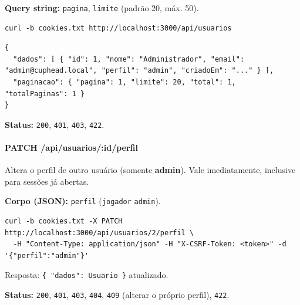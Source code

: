 \textbf{Query string:} \texttt{pagina}, \texttt{limite} (padrão 20, máx.
50).

\begin{Verbatim}[breaklines,breakanywhere,fontsize=\scriptsize]
curl -b cookies.txt http://localhost:3000/api/usuarios
\end{Verbatim}

\begin{Verbatim}[breaklines,breakanywhere,fontsize=\scriptsize]
{
  "dados": [ { "id": 1, "nome": "Administrador", "email": "admin@cuphead.local", "perfil": "admin", "criadoEm": "..." } ],
  "paginacao": { "pagina": 1, "limite": 20, "total": 1, "totalPaginas": 1 }
}
\end{Verbatim}

\textbf{Status:} \texttt{200}, \texttt{401}, \texttt{403}, \texttt{422}.

\hypertarget{patch-apiusuariosidperfil}{%
\paragraph{PATCH
/api/usuarios/:id/perfil}\label{patch-apiusuariosidperfil}}

Altera o perfil de outro usuário (somente \textbf{admin}). Vale
imediatamente, inclusive para sessões já abertas.

\textbf{Corpo (JSON):} \texttt{perfil} (\texttt{jogador} \textbar{}
\texttt{admin}).

\begin{Verbatim}[breaklines,breakanywhere,fontsize=\scriptsize]
curl -b cookies.txt -X PATCH http://localhost:3000/api/usuarios/2/perfil \
  -H "Content-Type: application/json" -H "X-CSRF-Token: <token>" -d '{"perfil":"admin"}'
\end{Verbatim}

Resposta: \texttt{\{\ "dados":\ Usuario\ \}} atualizado.

\textbf{Status:} \texttt{200}, \texttt{401}, \texttt{403}, \texttt{404},
\texttt{409} (alterar o próprio perfil), \texttt{422}.

